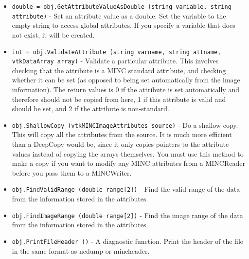 \begin{itemize}
\item  \verb|double = obj.GetAttributeValueAsDouble (string variable, string attribute)| -  Set an attribute value as a double.  Set the variable
 to the empty string to access global attributes.
 If you specify a variable that does not exist, it will be
 created.

\item  \verb|int = obj.ValidateAttribute (string varname, string attname, vtkDataArray array)| -  Validate a particular attribute.  This involves checking
 that the attribute is a MINC standard attribute, and checking
 whether it can be set (as opposed to being set automatically
 from the image information).  The return values is 0 if
 the attribute is set automatically and therefore should not
 be copied from here, 1 if this attribute is valid and should
 be set, and 2 if the attribute is non-standard.

\item  \verb|obj.ShallowCopy (vtkMINCImageAttributes source)| -  Do a shallow copy.  This will copy all the attributes
 from the source.  It is much more efficient than a DeepCopy
 would be, since it only copies pointers to the attribute values
 instead of copying the arrays themselves.  You must use this
 method to make a copy if you want to modify any MINC attributes
 from a MINCReader before you pass them to a MINCWriter.

\item  \verb|obj.FindValidRange (double range[2])| -  Find the valid range of the data from the information stored
 in the attributes.

\item  \verb|obj.FindImageRange (double range[2])| -  Find the image range of the data from the information stored
 in the attributes.

\item  \verb|obj.PrintFileHeader ()| -  A diagnostic function.  Print the header of the file in 
 the same format as ncdump or mincheader.

\end{itemize}
